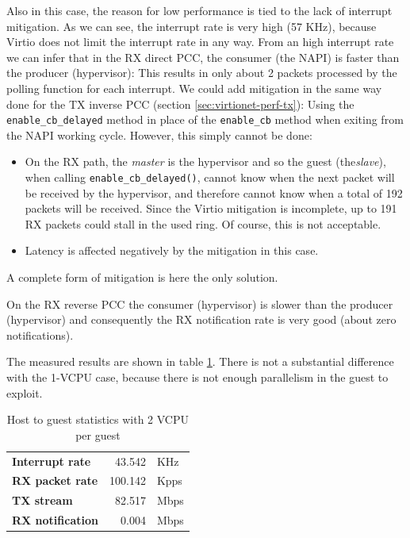Also in this case, the reason for low performance is tied to the lack of interrupt mitigation. As we can see, the interrupt rate is
very high (57 KHz), because Virtio does not limit the interrupt rate in any way. From an high interrupt rate we can infer that in the 
RX direct PCC, the consumer (the NAPI) is faster than the producer (hypervisor): This results in only about 2
packets processed by the polling function for each interrupt.
We could add mitigation in the same way done for the TX inverse PCC (section \ref{sec:virtionet-perf-tx}): Using
the \texttt{enable\_cb\_delayed} method in place of the \texttt{enable\_cb} method when exiting from the NAPI working cycle.
However, this simply cannot be done:
\begin{itemize}
  \item On the RX path, the \emph{master} is the hypervisor and so the guest (the\emph{slave}), when calling
	\texttt{enable\_cb\_delayed()}, cannot know when the next packet will be received by the hypervisor, and therefore cannot know
	when a total of 192 packets will be received. Since the Virtio mitigation is incomplete, up to 191 RX packets could stall
	in the used ring. Of course, this is not acceptable.
  \item Latency is affected negatively by the mitigation in this case.
\end{itemize}
A complete form of mitigation is here the only solution.

\vspace{0.5cm}

On the RX reverse PCC the consumer (hypervisor) is slower than the producer (hypervisor) and consequently the RX notification rate is
very good (about zero notifications).

\vspace{0.5cm}

The measured results are shown in table \ref{tab:virtionet-rx-g2hvcpu}. There is not a substantial difference with the 1-VCPU case, because
there is not enough parallelism in the guest to exploit.

\begin{table}
\begin{center}
\begin{tabular}{lrl}
\toprule
\textbf{Interrupt rate} & 43.542 & KHz\\
\textbf{RX packet rate} & 100.142 & Kpps\\
\textbf{TX stream} & 82.517 & Mbps\\
\textbf{RX notification} & 0.004 & Mbps\\
\bottomrule
\end{tabular}
\end{center}
\caption{Host to guest statistics with 2 VCPU per guest}
\label{tab:virtionet-rx-g2hvcpu}
\end{table}
